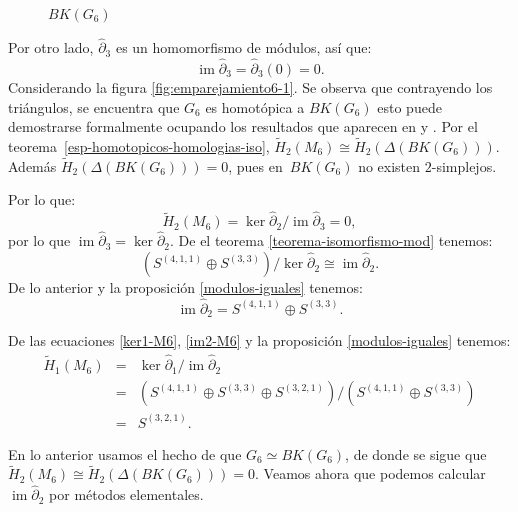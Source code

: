 \documentclass[12pt]{book}
\theoremstyle{definition}
\DeclareMathOperator{\im}{im}
\newcounter{in}
\newcounter{ini}
\begin{document}
\begin{figure}[h]
\begin{center}
\begin{minipage}{0.45\linewidth}
      \caption{$BK(G_{6})$}
      \label{grafica-contraible-M6}
    \end{minipage}
  \end{center}
\end{figure}

Por otro lado, $\widehat\partial_{3}$ es un homomorfismo de módulos, así que:
\begin{equation*}
  \im\widehat\partial_{3}=\widehat\partial_{3}(0)=0.
  \label{im3-KM5}
\end{equation*}
Considerando la figura \ref{fig:emparejamiento6-1}. Se observa que contrayendo los
triángulos, se encuentra que $G_{6}$ es homotópica a $BK(G_{6})$ esto
puede demostrarse formalmente ocupando los resultados que aparecen en
\cite{LPV08a} y \cite{Pri92}. Por el teorema~\ref{esp-homotopicos-homologias-iso}, $\widetilde
H_{2}(M_{6})\cong\widetilde H_{2}(\Delta(BK(G_{6})))$. Además
$\widetilde H_{2}(\Delta(BK(G_{6})))=0$, pues en~$BK(G_{6})$ no existen $2$-simplejos.

Por lo que:
\begin{equation*}
  \widetilde H_{2}(M_{6})=\ker \widehat\partial_{2}/\im \widehat\partial_{3}=0,
\end{equation*}
por lo que $\im \widehat\partial_{3}=\ker \widehat\partial_{2}$. De el teorema
\ref{teorema-isomorfismo-mod} tenemos:
$$(S^{(4,1,1)}\oplus S^{(3,3)})/\ker \widehat\partial_{2}\cong \im \widehat\partial_{2}.$$
De lo anterior y la proposición \ref{modulos-iguales} tenemos:
\begin{equation}
\im \widehat\partial_{2}=S^{(4,1,1)}\oplus S^{(3,3)}.
\label{im2-M6}
\end{equation}

De las ecuaciones \ref{ker1-M6}, \ref{im2-M6} y la proposición
\ref{modulos-iguales} tenemos:
\begin{eqnarray*}
  \widetilde H_{1}(M_{6})&=&\ker \widehat\partial_{1}/\im
  \widehat\partial_{2}\\
  &=&(S^{(4,1,1)}\oplus S^{(3,3)}\oplus
  S^{(3,2,1)})/(S^{(4,1,1)}\oplus S^{(3,3)})\\
  &=&S^{(3,2,1)}.
\end{eqnarray*}

En lo anterior usamos el hecho de que $G_{6}\simeq BK(G_{6})$, de donde
se sigue que $\widetilde H_{2}(M_{6})\cong\widetilde
H_{2}(\Delta(BK(G_{6})))=0$. Veamos ahora
que podemos calcular $\im \widehat\partial_{2}$ por métodos elementales.
\end{document}
